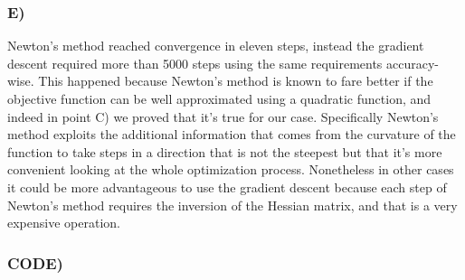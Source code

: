 \documentclass{article}
\begin{document}
\subsubsection*{E)}

Newton's method reached convergence in eleven steps, instead the gradient descent required more than 5000 steps using the same requirements accuracy-wise. This happened because Newton's method is known to fare better if the objective function can be well approximated using a quadratic function, and indeed in point C) we proved that it's true for our case. Specifically Newton's method exploits the additional information that comes from the curvature of the function to take steps in a direction that is not the steepest but that it's more convenient looking at the whole optimization process. Nonetheless in other cases it could be more advantageous to use the gradient descent because each step of Newton's method requires the inversion of the Hessian matrix, and that is a very expensive operation.

\newpage

\subsubsection*{CODE)}
\end{document}
